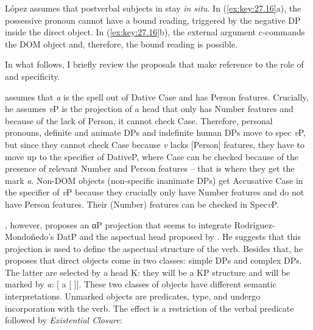 \documentclass[output=paper]{langsci/langscibook}
\begin{document}
\ea\label{ex:key:27.16} 
    \z
\z
López assumes that postverbal subjects in  stay \emph{in situ}. In
(\ref{ex:key:27.16}a), the possessive pronoun cannot have a bound reading,
triggered by the negative DP inside the direct object. In (\ref{ex:key:27.16}b),
the external argument c-commands the DOM object and, therefore, the bound
reading is possible.

In what follows, I briefly review the proposals that make reference to the role
of  and specificity.

\citet{Rodriguez-Mondonedo2007} assumes that \emph{a} is the spell out of
Dative Case and has Person features. Crucially, he assumes \emph{v}P is the
projection of a head that only has Number features and because of the lack of
Person, it cannot check Case. Therefore, personal pronouns, definite and
animate DPs and indefinite human DPs move to spec \emph{v}P, but since they
cannot check Case because \emph{v} lacks [Person] features, they have to move
up to the specifier of DativeP, where Case can be checked because of the
presence of relevant Number and Person features -- that is where they get the
mark \emph{a}. Non-DOM objects (non-specific inanimate DPs) get Accusative Case
in the specifier of \emph{v}P because they crucially only have Number features
and do not have Person features. Their (Number) features
can be checked in Spec\emph{v}P.

\textcite{Lopez2012}, however, proposes an αP projection that seems to
integrate Rod\-rí\-guez-Mondoñedo's DatP and the aspectual head proposed by
\citet{Torrego1998}. He suggests that this projection is used to define the
aspectual structure of the verb. Besides that, he proposes that direct objects
come in two classes: simple DPs and complex DPs. The latter are selected by a
head K: they will be a KP structure and will be marked by \emph{a}: [ a
[ ]]. These two classes of objects have different semantic
interpretations. Unmarked objects are predicates,  type, and undergo
incorporation with the verb. The effect is a restriction of the verbal
predicate followed by \emph{Existential Closure}:
\end{document}
